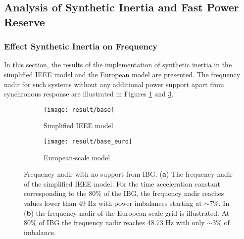 \subsection{Analysis of Synthetic Inertia and Fast Power Reserve}




\subsubsection{Effect Synthetic Inertia on Frequency}
\label{sec:res_si}
In this section, the results of the implementation of synthetic inertia in the simplified IEEE model and the European model are presented. The frequency nadir for such systems without any additional power support apart from synchronous response are illustrated in Figures \ref{fig:res_nadirieee_simp} and \ref{fig:res_nadireuro}.\\

\begin{figure}[h]
	\centering
	\begin{subfigure}[h]{0.49\textwidth}
		\centering
		\texttt{[image: result/base]}
		\caption{Simplified IEEE model}
		\label{fig:res_nadirieee_simp}
	\end{subfigure}
	\hfill
	\begin{subfigure}[h]{0.49\textwidth}
		\centering
		\texttt{[image: result/base\_euro]}
		\caption{European-scale model}
		\label{fig:res_nadireuro}
	\end{subfigure}
	
	
	\caption{Frequency nadir with no support from IBG. (\textbf{a}) The frequency nadir of the simplified IEEE model. For the time acceleration constant corresponding to the 80\% of the IBG, the frequency nadir reaches values lower than 49 Hz with power imbalances starting at $ \sim 7\% $. In (\textbf{b}) the frequency nadir of the European-scale grid is illustrated. At 80\% of IBG the frequency nadir reaches 48.73 Hz with only $\sim 3\% $ of imbalance.}
\end{figure}

